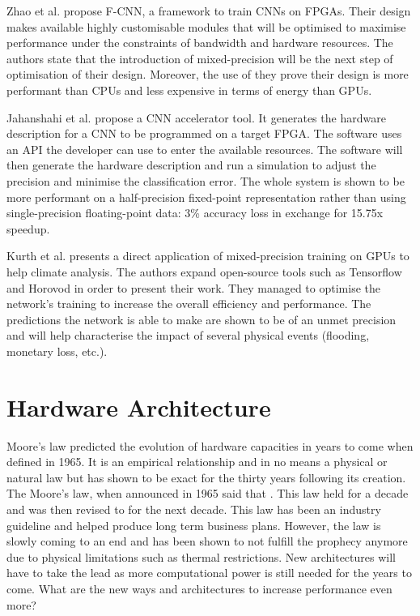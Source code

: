 Zhao et al. \cite{Zhao2016} propose F-CNN, a framework to train CNNs on FPGAs. Their design makes available highly customisable modules that will be optimised to maximise performance under the constraints of bandwidth and hardware resources. The authors state that the introduction of mixed-precision will be the next step of optimisation of their design. Moreover, the use of they prove their design is more performant than CPUs and less expensive in terms of energy than GPUs.

Jahanshahi et al. \cite{Jahanshahi2019} propose a CNN accelerator tool. It generates the hardware description for a CNN to be programmed on a target FPGA. The software uses an API the developer can use to enter the available resources. The software will then generate the hardware description and run a simulation to adjust the precision and minimise the classification error. The whole system is shown to be more performant on a half-precision fixed-point representation rather than using single-precision floating-point data: 3\% accuracy loss in exchange for 15.75x speedup.

Kurth et al. \cite{Kurth2018} presents a direct application of mixed-precision training on GPUs to help climate analysis. The authors expand open-source tools such as Tensorflow and Horovod in order to present their work. They managed to optimise the network's training to increase the overall efficiency and performance. The predictions the network is able to make are shown to be of an unmet precision and will help characterise the impact of several physical events (flooding, monetary loss, etc.).


\section{Hardware Architecture}

Moore's law \cite{Moore2006} predicted the evolution of hardware capacities in years to come when defined in 1965. It is an empirical relationship and in no means a physical or natural law but has shown to be exact for the thirty years following its creation. The Moore's law, when announced in 1965 said that . This law held for a decade and was then revised to  for the next decade. This law has been an industry guideline and helped produce long term business plans. However, the law is slowly coming to an end and has been shown to not fulfill the prophecy anymore due to physical limitations such as thermal restrictions. New architectures will have to take the lead as more computational power is still needed for the years to come. What are the new ways and architectures to increase performance even more?

